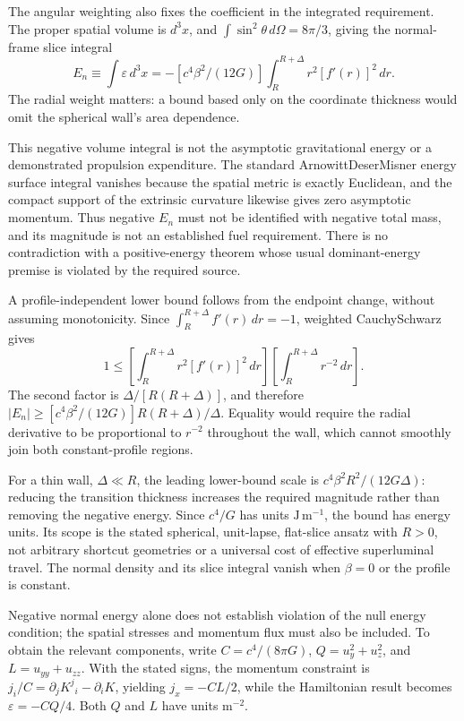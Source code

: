 \documentclass[11pt]{article}
\begin{document}
The angular weighting also fixes the coefficient in the integrated requirement. The proper spatial volume is $d^3x$, and $\int\sin^2\theta\,d\Omega=8\pi/3$, giving the normal-frame slice integral \[E_n\equiv\int\varepsilon\,d^3x=-[c^4\beta^2/(12G)]\int_R^{R+\Delta}r^2[f'(r)]^2\,dr.\] The radial weight matters: a bound based only on the coordinate thickness would omit the spherical wall\textquoteright{}s area dependence.

This negative volume integral is not the asymptotic gravitational energy or a demonstrated propulsion expenditure. The standard Arnowitt\textendash{}\allowbreak{}Deser\textendash{}\allowbreak{}Misner energy surface integral vanishes because the spatial metric is exactly Euclidean, and the compact support of the extrinsic curvature likewise gives zero asymptotic momentum. Thus negative $E_n$ must not be identified with negative total mass, and its magnitude is not an established fuel requirement. There is no contradiction with a positive-energy theorem whose usual dominant-energy premise is violated by the required source.

A profile-independent lower bound follows from the endpoint change, without assuming monotonicity. Since $\int_R^{R+\Delta}f'(r)\,dr=-1$, weighted Cauchy\textendash{}\allowbreak{}Schwarz gives \[1\leq[\int_R^{R+\Delta}r^2[f'(r)]^2\,dr][\int_R^{R+\Delta}r^{-2}\,dr].\] The second factor is $\Delta/[R(R+\Delta)]$, and therefore $|E_n|\geq[c^4\beta^2/(12G)]R(R+\Delta)/\Delta$. Equality would require the radial derivative to be proportional to $r^{-2}$ throughout the wall, which cannot smoothly join both constant-profile regions.

For a thin wall, $\Delta\ll R$, the leading lower-bound scale is $c^4\beta^2R^2/(12G\Delta)$: reducing the transition thickness increases the required magnitude rather than removing the negative energy. Since $c^4/G$ has units $\mathrm{J\,m^{-1}}$, the bound has energy units. Its scope is the stated spherical, unit-lapse, flat-slice ansatz with $R>0$, not arbitrary shortcut geometries or a universal cost of effective superluminal travel. The normal density and its slice integral vanish when $\beta=0$ or the profile is constant.

Negative normal energy alone does not establish violation of the null energy condition; the spatial stresses and momentum flux must also be included. To obtain the relevant components, write $C=c^4/(8\pi G)$, $Q=u_y^2+u_z^2$, and $L=u_{yy}+u_{zz}$. With the stated signs, the momentum constraint is $j_i/C=\partial_jK^j{}_i-\partial_iK$, yielding $j_x=-CL/2$, while the Hamiltonian result becomes $\varepsilon=-CQ/4$. Both $Q$ and $L$ have units $\mathrm{m^{-2}}$.
\end{document}
